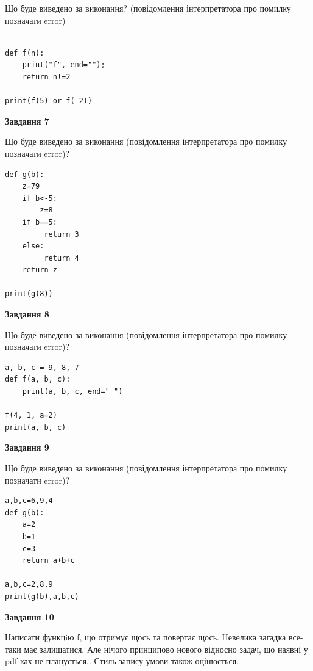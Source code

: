 \documentclass[12pt, ukrainian]{article}
\begin{document}
{\begin {large}
Що буде виведено за виконання? (повідомлення інтерпретатора про помилку позначати error)\par
\begin{verbatim}

def f(n):
    print("f", end="");
    return n!=2

print(f(5) or f(-2))
\end{verbatim}

{\begin {center}\textbf{Завдання 7}\end {center}}

Що буде виведено за виконання (повідомлення інтерпретатора про помилку позначати error)?\par
\begin{verbatim}
def g(b):
    z=79
    if b<-5: 
        z=8
    if b==5:
         return 3
    else:
         return 4
    return z

print(g(8))
\end{verbatim}

{\begin {center}\textbf{Завдання 8}\end {center}}

Що буде виведено за виконання (повідомлення інтерпретатора про помилку позначати error)?\par
\begin{verbatim}
a, b, c = 9, 8, 7
def f(a, b, c):
    print(a, b, c, end=" ")

f(4, 1, a=2)
print(a, b, c)
\end{verbatim}

{\begin {center}\textbf{Завдання 9}\end {center}}

Що буде виведено за виконання (повідомлення інтерпретатора про помилку позначати error)?\par
\begin{verbatim}
a,b,c=6,9,4
def g(b):
    a=2
    b=1
    c=3
    return a+b+c

a,b,c=2,8,9
print(g(b),a,b,c)
\end{verbatim}

{\begin {center}\textbf{Завдання 10}\end {center}}


Написати функцiю f, що отримує щось та повертає щось. Невелика загадка все-таки має залишатися. Але нічого принципово нового відносно задач, що наявні у pdf-ках не планується.. Стиль запису умови також оцінюється.\par
\end {large}}
\newpage
\end{document}
